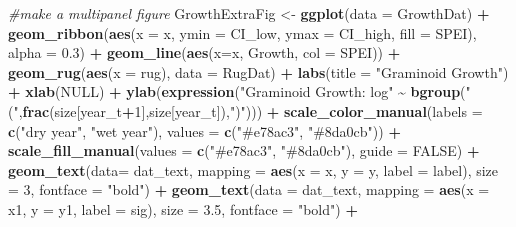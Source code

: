 \documentclass[
]{article}
\newenvironment{Shaded}{\begin{snugshade}}{\end{snugshade}}
\newcommand{\CommentTok}[1]{\textcolor[rgb]{0.56,0.35,0.01}{\textit{#1}}}
\newcommand{\DataTypeTok}[1]{\textcolor[rgb]{0.13,0.29,0.53}{#1}}
\newcommand{\DecValTok}[1]{\textcolor[rgb]{0.00,0.00,0.81}{#1}}
\newcommand{\FloatTok}[1]{\textcolor[rgb]{0.00,0.00,0.81}{#1}}
\newcommand{\KeywordTok}[1]{\textcolor[rgb]{0.13,0.29,0.53}{\textbf{#1}}}
\newcommand{\NormalTok}[1]{#1}
\newcommand{\OperatorTok}[1]{\textcolor[rgb]{0.81,0.36,0.00}{\textbf{#1}}}
\newcommand{\OtherTok}[1]{\textcolor[rgb]{0.56,0.35,0.01}{#1}}
\newcommand{\StringTok}[1]{\textcolor[rgb]{0.31,0.60,0.02}{#1}}
\begin{document}
\begin{Shaded}
\begin{Highlighting}[]
\CommentTok{\#make a multipanel figure}
\NormalTok{GrowthExtraFig \textless{}{-}}\StringTok{ }\KeywordTok{ggplot}\NormalTok{(}\DataTypeTok{data =}\NormalTok{ GrowthDat) }\OperatorTok{+}
\StringTok{  }\KeywordTok{geom\_ribbon}\NormalTok{(}\KeywordTok{aes}\NormalTok{(}\DataTypeTok{x =}\NormalTok{ x, }\DataTypeTok{ymin =}\NormalTok{ CI\_low, }\DataTypeTok{ymax =}\NormalTok{ CI\_high, }\DataTypeTok{fill =}\NormalTok{ SPEI), }\DataTypeTok{alpha =} \FloatTok{0.3}\NormalTok{) }\OperatorTok{+}
\StringTok{  }\KeywordTok{geom\_line}\NormalTok{(}\KeywordTok{aes}\NormalTok{(}\DataTypeTok{x=}\NormalTok{x, Growth, }\DataTypeTok{col =}\NormalTok{ SPEI))  }\OperatorTok{+}\StringTok{ }
\StringTok{  }\KeywordTok{geom\_rug}\NormalTok{(}\KeywordTok{aes}\NormalTok{(}\DataTypeTok{x =}\NormalTok{ rug), }\DataTypeTok{data =}\NormalTok{ RugDat) }\OperatorTok{+}
\StringTok{  }\KeywordTok{labs}\NormalTok{(}\DataTypeTok{title =} \StringTok{"Graminoid Growth"}\NormalTok{) }\OperatorTok{+}
\StringTok{  }\KeywordTok{xlab}\NormalTok{(}\OtherTok{NULL}\NormalTok{) }\OperatorTok{+}
\StringTok{  }\KeywordTok{ylab}\NormalTok{(}\KeywordTok{expression}\NormalTok{(}\StringTok{"Graminoid Growth: log"} \OperatorTok{\textasciitilde{}}\StringTok{ }\KeywordTok{bgroup}\NormalTok{(}\StringTok{"("}\NormalTok{,}\KeywordTok{frac}\NormalTok{(size[year\_t}\OperatorTok{+}\DecValTok{1}\NormalTok{],size[year\_t]),}\StringTok{")"}\NormalTok{)))  }\OperatorTok{+}
\StringTok{  }\KeywordTok{scale\_color\_manual}\NormalTok{(}\DataTypeTok{labels =} \KeywordTok{c}\NormalTok{(}\StringTok{"dry year"}\NormalTok{, }\StringTok{"wet year"}\NormalTok{), }\DataTypeTok{values =} \KeywordTok{c}\NormalTok{(}\StringTok{"\#e78ac3"}\NormalTok{, }\StringTok{"\#8da0cb"}\NormalTok{)) }\OperatorTok{+}
\StringTok{  }\KeywordTok{scale\_fill\_manual}\NormalTok{(}\DataTypeTok{values =} \KeywordTok{c}\NormalTok{(}\StringTok{"\#e78ac3"}\NormalTok{, }\StringTok{"\#8da0cb"}\NormalTok{), }\DataTypeTok{guide =} \OtherTok{FALSE}\NormalTok{) }\OperatorTok{+}
\StringTok{  }\KeywordTok{geom\_text}\NormalTok{(}\DataTypeTok{data=}\NormalTok{ dat\_text, }\DataTypeTok{mapping =} \KeywordTok{aes}\NormalTok{(}\DataTypeTok{x =}\NormalTok{ x, }\DataTypeTok{y =}\NormalTok{ y, }\DataTypeTok{label =}\NormalTok{ label), }\DataTypeTok{size =} \DecValTok{3}\NormalTok{, }\DataTypeTok{fontface =} \StringTok{"bold"}\NormalTok{) }\OperatorTok{+}
\StringTok{  }\KeywordTok{geom\_text}\NormalTok{(}\DataTypeTok{data =}\NormalTok{ dat\_text, }\DataTypeTok{mapping =} \KeywordTok{aes}\NormalTok{(}\DataTypeTok{x =}\NormalTok{ x1, }\DataTypeTok{y =}\NormalTok{ y1, }\DataTypeTok{label =}\NormalTok{ sig), }\DataTypeTok{size =} \FloatTok{3.5}\NormalTok{, }\DataTypeTok{fontface =} \StringTok{"bold"}\NormalTok{) }\OperatorTok{+}

\end{Highlighting}
\end{Shaded}
\end{document}
